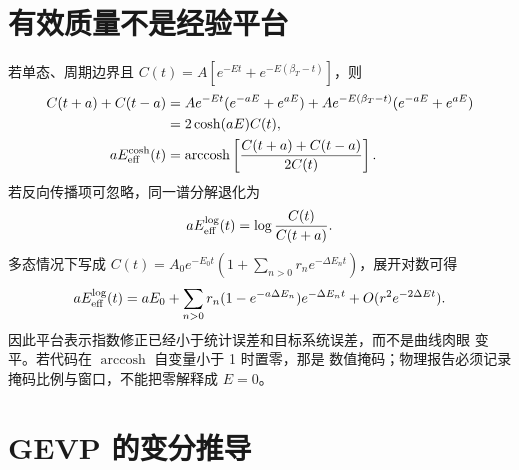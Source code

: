 \documentclass[UTF8,11pt,oneside]{ctexbook}
\begin{document}
\section{有效质量不是经验平台}

若单态、周期边界且
\(C(t)=A[e^{-Et}+e^{-E(\beta_T-t)}]\)，则
\begin{align}
 C(t+a)+C(t-a)
 &=A e^{-Et}(e^{-aE}+e^{aE})
  +A e^{-E(\beta_T-t)}(e^{-aE}+e^{aE}) \nonumber\\
 &=2\cosh(aE)C(t),
 \label{eq:deep-cosh-recursion}\\
 aE_{\rm eff}^{\cosh}(t)
 &=\operatorname{arccosh}\left[
 \frac{C(t+a)+C(t-a)}{2C(t)}\right].
 \label{eq:deep-cosh-identity}
\end{align}
若反向传播项可忽略，同一谱分解退化为
\begin{equation}
 aE_{\rm eff}^{\log}(t)=\log\frac{C(t)}{C(t+a)} .
 \label{eq:deep-log-effective-energy}
\end{equation}
多态情况下写成
\(C(t)=A_0e^{-E_0t}(1+\sum_{n>0}r_ne^{-\Delta E_nt})\)，展开对数可得
\begin{equation}
 aE_{\rm eff}^{\log}(t)=aE_0+
 \sum_{n>0}r_n(1-e^{-a\Delta E_n})e^{-\Delta E_nt}
 +O(r^2e^{-2\Delta E t}) .
 \label{eq:deep-effective-contamination}
\end{equation}
因此平台表示指数修正已经小于统计误差和目标系统误差，而不是曲线肉眼
变平。若代码在 \(\operatorname{arccosh}\) 自变量小于 1 时置零，那是
数值掩码；物理报告必须记录掩码比例与窗口，不能把零解释成 \(E=0\)。

\section{GEVP 的变分推导}
\end{document}
